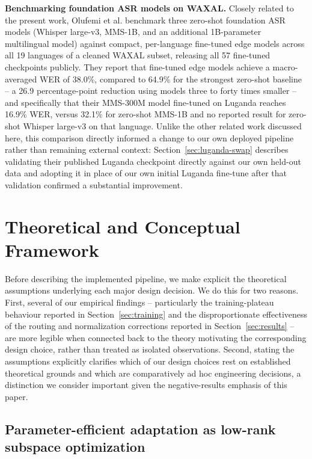 \documentclass[11pt]{article}
\begin{document}
\textbf{Benchmarking foundation ASR models on WAXAL.}
\label{sec:related-work-waxalnet}
Closely related to the present work, Olufemi et al. \cite{olufemi2026waxalnet} benchmark three zero-shot foundation ASR models (Whisper large-v3, MMS-1B, and an additional 1B-parameter multilingual model) against compact, per-language fine-tuned edge models across all 19 languages of a cleaned WAXAL subset, releasing all 57 fine-tuned checkpoints publicly. They report that fine-tuned edge models achieve a macro-averaged WER of 38.0\%, compared to 64.9\% for the strongest zero-shot baseline -- a 26.9 percentage-point reduction using models three to forty times smaller -- and specifically that their MMS-300M model fine-tuned on Luganda reaches 16.9\% WER, versus 32.1\% for zero-shot MMS-1B and no reported result for zero-shot Whisper large-v3 on that language. Unlike the other related work discussed here, this comparison directly informed a change to our own deployed pipeline rather than remaining external context: Section~\ref{sec:luganda-swap} describes validating their published Luganda checkpoint directly against our own held-out data and adopting it in place of our own initial Luganda fine-tune after that validation confirmed a substantial improvement.

\section{Theoretical and Conceptual Framework}
\label{sec:theory}

Before describing the implemented pipeline, we make explicit the theoretical assumptions underlying each major design decision. We do this for two reasons. First, several of our empirical findings -- particularly the training-plateau behaviour reported in Section~\ref{sec:training} and the disproportionate effectiveness of the routing and normalization corrections reported in Section~\ref{sec:results} -- are more legible when connected back to the theory motivating the corresponding design choice, rather than treated as isolated observations. Second, stating the assumptions explicitly clarifies which of our design choices rest on established theoretical grounds and which are comparatively ad hoc engineering decisions, a distinction we consider important given the negative-results emphasis of this paper.

\subsection{Parameter-efficient adaptation as low-rank subspace optimization}
\end{document}
